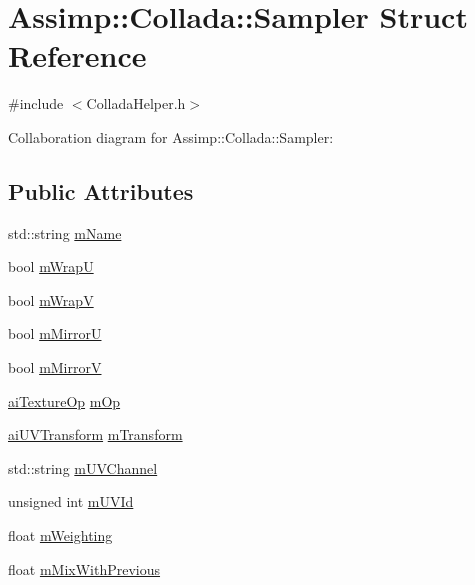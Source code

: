 \hypertarget{struct_assimp_1_1_collada_1_1_sampler}{\section{Assimp\+:\+:Collada\+:\+:Sampler Struct Reference}
\label{struct_assimp_1_1_collada_1_1_sampler}
}


{\ttfamily \#include $<$Collada\+Helper.\+h$>$}



Collaboration diagram for Assimp\+:\+:Collada\+:\+:Sampler\+:
\subsection*{Public Attributes}
\begin{DoxyCompactItemize}
\item 
std\+::string \hyperlink{struct_assimp_1_1_collada_1_1_sampler_aa64f138f728b417ef39c72820ba781d7}{m\+Name}
\item 
bool \hyperlink{struct_assimp_1_1_collada_1_1_sampler_ae0c316a46adf403a8db3093765cfbec0}{m\+Wrap\+U}
\item 
bool \hyperlink{struct_assimp_1_1_collada_1_1_sampler_a5a73db040dbc276c3ce0c177b1d1297e}{m\+Wrap\+V}
\item 
bool \hyperlink{struct_assimp_1_1_collada_1_1_sampler_a4c4485a21aeabe8a95087cba22f04f89}{m\+Mirror\+U}
\item 
bool \hyperlink{struct_assimp_1_1_collada_1_1_sampler_a140bba5380d353b5ba6223d2cb18fa5d}{m\+Mirror\+V}
\item 
\hyperlink{material_8h_afcd3096d69affba13114cedfc6f9ee6b}{ai\+Texture\+Op} \hyperlink{struct_assimp_1_1_collada_1_1_sampler_ae91688303ad15abfcfa250082a252c51}{m\+Op}
\item 
\hyperlink{structai_u_v_transform}{ai\+U\+V\+Transform} \hyperlink{struct_assimp_1_1_collada_1_1_sampler_a733ad7db38d80f166a277fc6e88df886}{m\+Transform}
\item 
std\+::string \hyperlink{struct_assimp_1_1_collada_1_1_sampler_a19102cbcdd6c060c6d19c17bbce7fba6}{m\+U\+V\+Channel}
\item 
unsigned int \hyperlink{struct_assimp_1_1_collada_1_1_sampler_a278de3d3c6bba24c401ed3fcddcccee2}{m\+U\+V\+Id}
\item 
float \hyperlink{struct_assimp_1_1_collada_1_1_sampler_a1e2084411b2e95819be8a7e9a9a01318}{m\+Weighting}
\item 
float \hyperlink{struct_assimp_1_1_collada_1_1_sampler_a73af972a68acf1bedb30b8f27081b9c8}{m\+Mix\+With\+Previous}
\end{DoxyCompactItemize}


